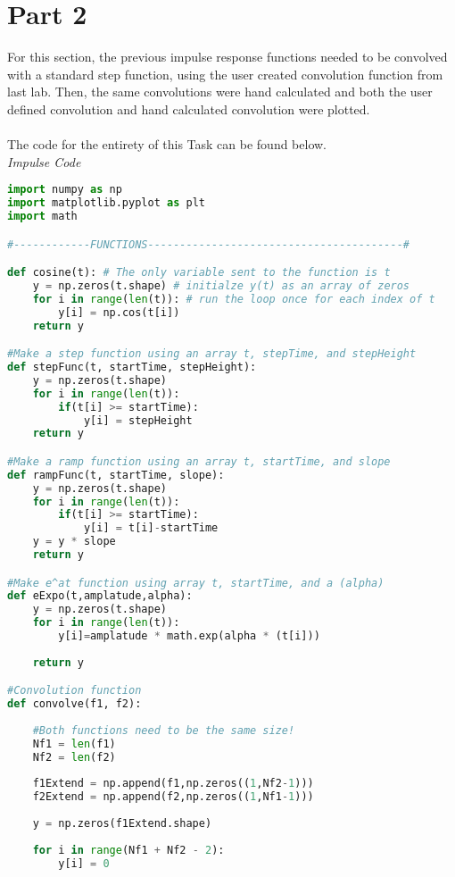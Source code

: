 \documentclass[12pt,a4paper]{article}
\begin{document}
\section{Part 2}
For this section, the previous impulse response functions needed to be convolved with a standard step function, using the user created convolution function from last lab. Then, the same convolutions were hand calculated and both the user defined convolution and hand calculated convolution were plotted.\\
\\
The code for the entirety of this Task can be found below.\\
\textit{Impulse Code}
\begin{lstlisting}[language=Python]
import numpy as np
import matplotlib.pyplot as plt
import math

#------------FUNCTIONS----------------------------------------#

def cosine(t): # The only variable sent to the function is t
    y = np.zeros(t.shape) # initialze y(t) as an array of zeros
    for i in range(len(t)): # run the loop once for each index of t
        y[i] = np.cos(t[i])
    return y

#Make a step function using an array t, stepTime, and stepHeight
def stepFunc(t, startTime, stepHeight):
    y = np.zeros(t.shape)
    for i in range(len(t)):
        if(t[i] >= startTime):
            y[i] = stepHeight
    return y

#Make a ramp function using an array t, startTime, and slope
def rampFunc(t, startTime, slope):
    y = np.zeros(t.shape)
    for i in range(len(t)):
        if(t[i] >= startTime):
            y[i] = t[i]-startTime
    y = y * slope
    return y

#Make e^at function using array t, startTime, and a (alpha)
def eExpo(t,amplatude,alpha):
    y = np.zeros(t.shape)
    for i in range(len(t)):
        y[i]=amplatude * math.exp(alpha * (t[i]))
    
    return y

#Convolution function
def convolve(f1, f2):
    
    #Both functions need to be the same size!
    Nf1 = len(f1)
    Nf2 = len(f2)
    
    f1Extend = np.append(f1,np.zeros((1,Nf2-1)))
    f2Extend = np.append(f2,np.zeros((1,Nf1-1)))
    
    y = np.zeros(f1Extend.shape)
    
    for i in range(Nf1 + Nf2 - 2):
        y[i] = 0
        

\end{lstlisting}
\end{document}
